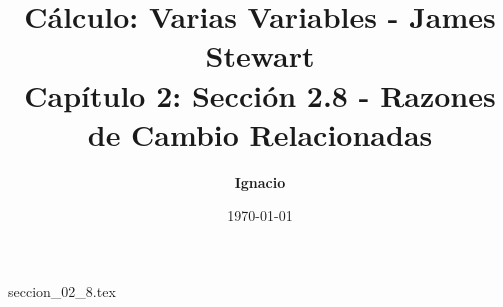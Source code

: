 \documentclass[11pt,spanish,oneside]{report}
\title{\textbf{Cálculo: Varias Variables - James Stewart} \\ \Large Capítulo 2: Sección 2.8 - Razones de Cambio Relacionadas}
\author{\textbf{Ignacio}}
\date{\today}
\begin{document}
\maketitle

{seccion_02_8.tex}
\end{document}
